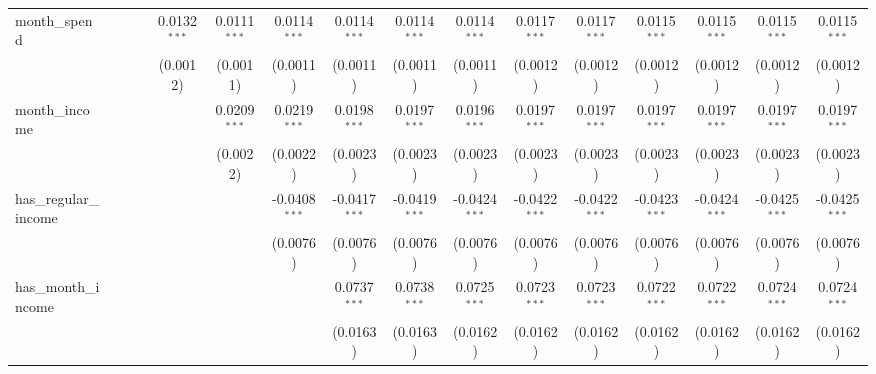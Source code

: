 \begin{table}[htbp]
\begin{tiny}
\begin{tabular}{lccccccccccccccc}
         month\_spend            &                 &                 &                 & 0.0132$^{***}$  & 0.0111$^{***}$  & 0.0114$^{***}$  & 0.0114$^{***}$  & 0.0114$^{***}$  & 0.0114$^{***}$  & 0.0117$^{***}$  & 0.0117$^{***}$  & 0.0115$^{***}$  & 0.0115$^{***}$  & 0.0115$^{***}$  & 0.0115$^{***}$\\
                                  &                 &                 &                 & (0.0012)        & (0.0011)        & (0.0011)        & (0.0011)        & (0.0011)        & (0.0011)        & (0.0012)        & (0.0012)        & (0.0012)        & (0.0012)        & (0.0012)        & (0.0012)\\
         month\_income           &                 &                 &                 &                 & 0.0209$^{***}$  & 0.0219$^{***}$  & 0.0198$^{***}$  & 0.0197$^{***}$  & 0.0196$^{***}$  & 0.0197$^{***}$  & 0.0197$^{***}$  & 0.0197$^{***}$  & 0.0197$^{***}$  & 0.0197$^{***}$  & 0.0197$^{***}$\\
                                  &                 &                 &                 &                 & (0.0022)        & (0.0022)        & (0.0023)        & (0.0023)        & (0.0023)        & (0.0023)        & (0.0023)        & (0.0023)        & (0.0023)        & (0.0023)        & (0.0023)\\
         has\_regular\_income   &                 &                 &                 &                 &                 & -0.0408$^{***}$ & -0.0417$^{***}$ & -0.0419$^{***}$ & -0.0424$^{***}$ & -0.0422$^{***}$ & -0.0422$^{***}$ & -0.0423$^{***}$ & -0.0424$^{***}$ & -0.0425$^{***}$ & -0.0425$^{***}$\\
                                  &                 &                 &                 &                 &                 & (0.0076)        & (0.0076)        & (0.0076)        & (0.0076)        & (0.0076)        & (0.0076)        & (0.0076)        & (0.0076)        & (0.0076)        & (0.0076)\\
         has\_month\_income     &                 &                 &                 &                 &                 &                 & 0.0737$^{***}$  & 0.0738$^{***}$  & 0.0725$^{***}$  & 0.0723$^{***}$  & 0.0723$^{***}$  & 0.0722$^{***}$  & 0.0722$^{***}$  & 0.0724$^{***}$  & 0.0724$^{***}$\\
                                  &                 &                 &                 &                 &                 &                 & (0.0163)        & (0.0163)        & (0.0162)        & (0.0162)        & (0.0162)        & (0.0162)        & (0.0162)        & (0.0162)        & (0.0162)\\

\end{tabular}
\end{tiny}
\end{table}
